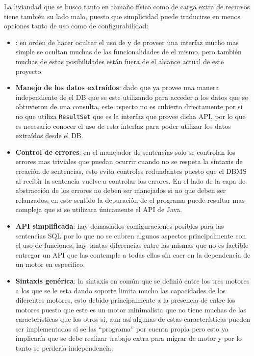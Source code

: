 La liviandad que se busco tanto en tamaño físico como de carga extra de recursos tiene también su lado malo, puesto que simplicidad puede traducirse en menos opciones tanto de uso como de configurabilidad:
%
\begin{itemize}
\item \textbf{\jd}: en orden de hacer ocultar el uso de \jd y de proveer una interfaz mucho mas simple se ocultan muchas de las funcionalidades de el mismo, pero también muchas de estas posibilidades están fuera de el alcance actual de este proyecto.
%
\item \textbf{Manejo de los datos extraídos}: dado que \jd ya provee una manera independiente de el DB que se este utilizando para acceder a los datos que se obtuvieron de una consulta, este aspecto no es cubierto directamente por \jj si no que utiliza \verb=ResultSet= que es la interfaz que provee dicha API, por lo que es necesario conocer el uso de esta interfaz para poder utilizar los datos extraídos desde el DB.
%
\item \textbf{Control de errores}: en el manejador de sentencias solo se controlan los errores mas triviales que puedan ocurrir cuando no se respeta la sintaxis de creación de sentencias, esto evita controles redundantes puesto que el DBMS al recibir la sentencia vuelve a controlar los errores. En el lado de la capa de abstracción de \jd los errores no deben ser manejados si no que deben ser relanzados, en este sentido la depuración de el programa puede resultar mas compleja que si se utilizara únicamente el API de Java.
%
\item \textbf{API simplificada}: hay demasiados configuraciones posibles para las sentencias SQL por lo que no se cubren algunos aspectos principalmente con el uso de funciones, hay tantas diferencias entre las mismas que no es factible entregar un API que las contemple a todas ellas sin caer en la dependencia de un motor en especifico.
%
\item \textbf{Sintaxis genérica}: la sintaxis en común que se definió entre los tres motores a los que se le esta dando soporte limita mucho las capacidades de los diferentes motores, esto debido principalmente a la presencia de \s entre los motores puesto que este es un motor minimalista que no tiene muchas de las características que los otros si, aun así algunas de estas características pueden ser implementadas si se las ``programa'' por cuenta propia pero esto ya implicaría que se debe realizar trabajo extra para migrar de motor y por lo tanto se perdería independencia. 
\end{itemize}
%
%
%
